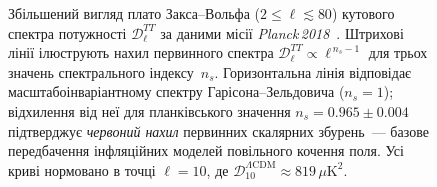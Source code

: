 \begin{figure}[htbp]
\caption{%
    Збільшений вигляд плато Закса--Вольфа ($2 \leq \ell \lesssim 80$)
    кутового спектра потужності $\mathcal{D}_\ell^{TT}$
    за даними місії \emph{Planck\,2018}~\cite{planck_2018}.
    Штрихові лінії ілюструють нахил первинного спектра
    $\mathcal{D}_\ell^{TT} \propto \ell^{\,n_s - 1}$
    для трьох значень спектрального індексу~$n_s$.
    Горизонтальна лінія відповідає масштабоінваріантному спектру
    Гарісона--Зельдовича ($n_s = 1$);
    відхилення від неї для планківського значення
    $n_s = 0.965 \pm 0.004$ підтверджує \emph{червоний нахил}
    первинних скалярних збурень~--- базове передбачення
    інфляційних моделей повільного кочення поля.
    Усі криві нормовано в точці $\ell = 10$,
    де $\mathcal{D}_{10}^{\Lambda\mathrm{CDM}} \approx 819\,\mu\mathrm{K}^2$.%
}
\label{fig:ns_tilt}
\end{figure}